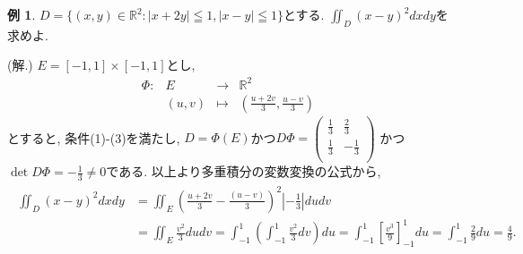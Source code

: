 \documentclass[dvipdfmx,a4paper,11pt]{article}
\newcommand{\R}{\mathbb{R}}
\theoremstyle{definition}
\newtheorem{exa}[thm]{例}
\begin{document}
\begin{exa}
$D= \{ (x,y)\in \R^2 : |x+2y|\leqq1, |x-y|\leqq1 \}$とする. 
$\iint_{D} (x-y)^2dxdy$を求めよ.

\hspace{-11pt}(解.) 
$E=[-1,1]\times[-1,1]$とし, 
 $$
\begin{array}{ccccc}
\Phi: &E & \rightarrow & \R^2 & \\
&(u,v) & \longmapsto & (\frac{u+2v}{3} , \frac{u-v}{3} )&
\end{array}
$$
とすると, 条件(1)-(3)を満たし, 
$D = \Phi(E)$かつ$
D\Phi=
\left(\begin{array}{cc} \frac{1}{3} &\frac{2}{3} \\ \frac{1}{3}&-\frac{1}{3} \\ \end{array} \right)
$
かつ$\det D\Phi = -\frac{1}{3}\neq 0$である.
以上より多重積分の変数変換の公式から, 
\begin{align*}
\begin{split}
\iint_{D} (x-y)^2dxdy
&=
\iint_{E} \left(  \frac{u+2v}{3} - \frac{(u-v)}{3} \right)^2 \left| -\frac{1}{3}\right| dudv \\
&= 
\iint_{E} \frac{v^2}{3} dudv
=
\int_{-1}^{1} \left( \int_{-1}^{1} \frac{v^2}{3} dv\right)du 
=
\int_{-1}^{1} \left[ \frac{v^3}{9}\right]_{-1}^{1} du
=\int_{-1}^{1}  \frac{2}{9} du
=\frac{4}{9}. 
 \end{split}
  \end{align*}




\end{exa}
 
 
\end{document}
